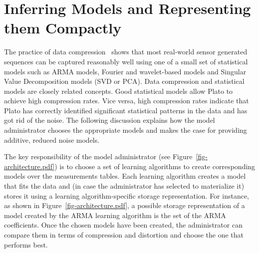 
\section{Inferring Models and Representing them Compactly}
\label{sec:compression}
The practice of data compression~\cite{Sayood12} shows that most
real-world sensor generated sequences can be captured reasonably
well using one of a small set of statistical models such as ARMA
models, Fourier and wavelet-based models and Singular Value
Decomposition models (SVD or PCA). 
Data compression and statistical models are closely related
concepts. Good statistical models allow Plato to achieve high
compression rates. Vice versa, high compression rates indicate
that Plato has correctly identified significant statistical patterns
in the data and has got rid of the noise. The following discussion
explains how the model administrator chooses the appropriate models
and makes the case for providing additive, reduced noise models.

The key responsibility of the model administrator (see Figure~\ref{fig-architecture.pdf}) is to choose a set of learning algorithms to create corresponding models over the measurements tables. Each learning algorithm creates a model that fits the data and (in case the administrator has selected to materialize it) stores it using a learning algorithm-specific storage representation. For instance, as shown in Figure~\ref{fig-architecture.pdf}, a possible storage representation of a model created by the ARMA learning algorithm is the set of the ARMA coefficients. Once the chosen models have been created, the administrator can compare them in terms of compression and distortion and choose the one that performs best.


